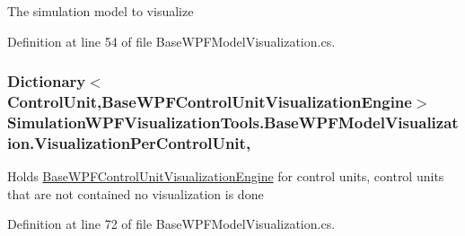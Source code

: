 The simulation model to visualize 



Definition at line 54 of file Base\+W\+P\+F\+Model\+Visualization.\+cs.

\subsubsection[{\texorpdfstring{Visualization\+Per\+Control\+Unit}{VisualizationPerControlUnit}}]{\setlength{\rightskip}{0pt plus 5cm}Dictionary$<${\bf Control\+Unit},{\bf Base\+W\+P\+F\+Control\+Unit\+Visualization\+Engine}$>$ Simulation\+W\+P\+F\+Visualization\+Tools.\+Base\+W\+P\+F\+Model\+Visualization.\+Visualization\+Per\+Control\+Unit\hspace{0.3cm}{\ttfamily [get]}, {\ttfamily [set]}}\hypertarget{class_simulation_w_p_f_visualization_tools_1_1_base_w_p_f_model_visualization_a35bd92df2526f5c9044075486fdadbeb}{}\label{class_simulation_w_p_f_visualization_tools_1_1_base_w_p_f_model_visualization_a35bd92df2526f5c9044075486fdadbeb}


Holds \hyperlink{class_simulation_w_p_f_visualization_tools_1_1_base_w_p_f_control_unit_visualization_engine}{Base\+W\+P\+F\+Control\+Unit\+Visualization\+Engine} for control units, control units that are not contained no visualization is done 



Definition at line 72 of file Base\+W\+P\+F\+Model\+Visualization.\+cs.

